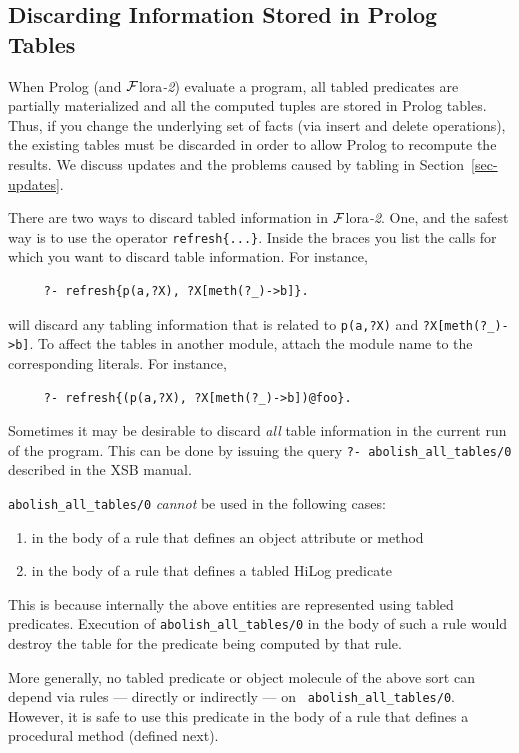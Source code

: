 \documentclass[11pt]{article}
\newcommand{\FLORA}{{\mbox{\sc ${\cal F}${lora}\rm\emph{-2}}}\xspace}
\begin{document}
\subsection{Discarding Information Stored in Prolog Tables}

When Prolog (and \FLORA) evaluate a program, all tabled predicates are
partially materialized and all the computed tuples are stored in Prolog
tables. Thus, if you change the underlying set of facts (via insert and
delete operations), the existing tables must be discarded in order to allow
Prolog to recompute the results.  We discuss updates and the problems
caused by tabling in Section~\ref{sec-updates}.

There are two ways to discard tabled information in \FLORA. One, and the
safest way is to use the operator {\tt refresh\{...\}}. Inside the braces
you list the calls for which you want to discard table information.  For
instance,
\begin{verbatim}
     ?- refresh{p(a,?X), ?X[meth(?_)->b]}.
\end{verbatim}
will discard any tabling information that is related to   {\tt p(a,?X)}
and {\tt ?X[meth(?\_)->b]}.
To affect the tables in another module, attach the module name to the
corresponding literals. For instance,
\begin{verbatim}
     ?- refresh{(p(a,?X), ?X[meth(?_)->b])@foo}.
\end{verbatim}

Sometimes it may be desirable to discard \emph{all} table information in the
current run of the program.
This can be done by issuing the
query {\tt ?- abolish\_all\_tables/0} described in the XSB manual.

{\tt abolish\_all\_tables/0} \emph{cannot} be
used in the following cases:
\begin{enumerate}
  \item  in the body of a rule that defines an object attribute or method
  \item  in the body of a rule that defines a tabled HiLog predicate
\end{enumerate}
This is because internally the above entities are represented using tabled
predicates. Execution of {\tt abolish\_all\_tables/0} in the body of such a
rule would destroy the table for the predicate being computed by that rule.

More generally, no tabled predicate or object molecule of the above sort
can depend via rules --- directly or indirectly --- on {\tt
  abolish\_all\_tables/0}.  However, it is safe to use this predicate in
the body of a rule that defines a procedural method (defined next).
\end{document}
